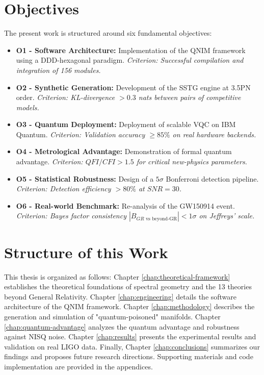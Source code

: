 \documentclass[11pt,a4paper,spanish]{book}
\numberwithin{equation}{chapter}
\numberwithin{figure}{chapter}
\numberwithin{equation}{chapter}
\numberwithin{figure}{chapter}
\numberwithin{table}{chapter}
\begin{document}
\section{Objectives}
\label{sec:objectives}

The present work is structured around six fundamental objectives:

\begin{itemize}
    \item \textbf{O1 - Software Architecture:} Implementation of the QNIM framework using a DDD-hexagonal paradigm. \textit{Criterion: Successful compilation and integration of 156 modules.}
    \item \textbf{O2 - Synthetic Generation:} Development of the SSTG engine at 3.5PN order. \textit{Criterion: KL-divergence $> 0.3$ nats between pairs of competitive models.}
    \item \textbf{O3 - Quantum Deployment:} Deployment of scalable VQC on IBM Quantum. \textit{Criterion: Validation accuracy $\ge 85\%$ on real hardware backends.}
    \item \textbf{O4 - Metrological Advantage:} Demonstration of formal quantum advantage. \textit{Criterion: $QFI/CFI > 1.5$ for critical new-physics parameters.}
    \item \textbf{O5 - Statistical Robustness:} Design of a $5\sigma$ Bonferroni detection pipeline. \textit{Criterion: Detection efficiency $> 80\%$ at $SNR=30$.}
    \item \textbf{O6 - Real-world Benchmark:} Re-analysis of the GW150914 event. \textit{Criterion: Bayes factor consistency $|B_{GR \text{ vs beyond-GR}}| < 1\sigma$ on Jeffreys' scale.}
\end{itemize}

\section{Structure of this Work}
\label{sec:structure}

This thesis is organized as follows: Chapter \ref{chap:theoretical-framework} establishes the theoretical foundations of spectral geometry and the 13 theories beyond General Relativity. Chapter \ref{chap:engineering} details the software architecture of the QNIM framework. Chapter \ref{chap:methodology} describes the generation and simulation of "quantum-poisoned" manifolds. Chapter \ref{chap:quantum-advantage} analyzes the quantum advantage and robustness against NISQ noise. Chapter \ref{chap:results} presents the experimental results and validation on real LIGO data. Finally, Chapter \ref{chap:conclusions} summarizes our findings and proposes future research directions. Supporting materials and code implementation are provided in the appendices.
\end{document}
